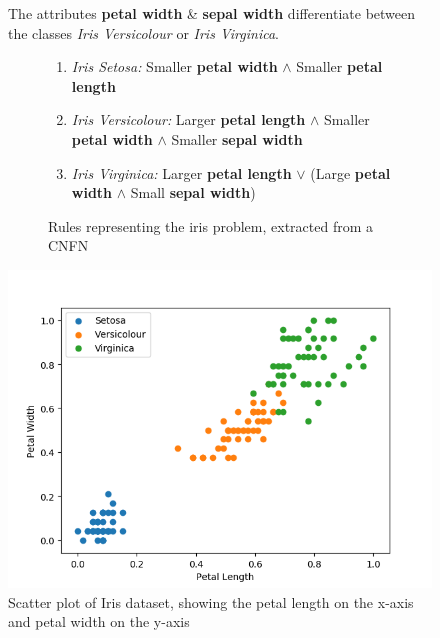 \begin{figure}[H]
	\centering

	\begin{minipage}[p]{0.51\textwidth}
	 The attributes \textbf{petal width} \& \textbf{sepal width} differentiate between the classes \textit{Iris Versicolour} or \textit{Iris Virginica}.
	 \begin{figure}[H]
	 	\begin{enumerate}
	 		\item \textit{Iris Setosa: } Smaller \textbf{petal width} $\land$ Smaller \textbf{petal length}
	 		\item \textit{Iris Versicolour: } Larger \textbf{petal length} $\land$ Smaller \textbf{petal width} $\land$ Smaller \textbf{sepal width}
	 		\item \textit{Iris Virginica: } Larger \textbf{petal length} $\lor$ (Large \textbf{petal width} $\land$ Small \textbf{sepal width})
	 	\end{enumerate}
 		\caption{Rules representing the iris problem, extracted from a CNFN}
 		\label{fig:iris-rules}
	 \end{figure}
	\end{minipage}
	\hspace{4px}
	\begin{minipage}[p]{0.45\textwidth}
		\includegraphics[width=\textwidth]{IrisData(petal(length-vs-width)).png}
		\caption{Scatter plot of Iris dataset, showing the petal length on the x-axis and petal width on the y-axis}
		\label{fig:iris-data-petal-length-vs-width}
	\end{minipage}
	\hfill
\end{figure}

